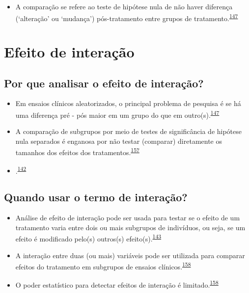 \documentclass[
  a4paper,
]{book}
\providecommand{\tightlist}{%
  \setlength{\itemsep}{0pt}\setlength{\parskip}{0pt}}
\begin{document}
\begin{itemize}
\tightlist
\item
  A comparação se refere ao teste de hipótese nula de não haver diferença (`alteração' ou `mudança') pós-tratamento entre grupos de tratamento.\textsuperscript{\protect\hyperlink{ref-bland2011}{147}}
\end{itemize}

\hypertarget{interacao}{%
\section{Efeito de interação}\label{interacao}}

\hypertarget{por-que-analisar-o-efeito-de-interauxe7uxe3o}{%
\subsection{Por que analisar o efeito de interação?}\label{por-que-analisar-o-efeito-de-interauxe7uxe3o}}

\begin{itemize}
\item
  Em ensaios clínicos aleatorizados, o principal problema de pesquisa é se há uma diferença pré - pós maior em um grupo do que em outro(s).\textsuperscript{\protect\hyperlink{ref-bland2011}{147}}
\item
  A comparação de subgrupos por meio de testes de significância de hipótese nula separados é enganosa por não testar (comparar) diretamente os tamanhos dos efeitos dos tratamentos.\textsuperscript{\protect\hyperlink{ref-Matthews1996}{157}}
\item
  .\textsuperscript{\protect\hyperlink{ref-Bours2023}{142}}
\end{itemize}

\hypertarget{quando-usar-o-termo-de-interauxe7uxe3o}{%
\subsection{Quando usar o termo de interação?}\label{quando-usar-o-termo-de-interauxe7uxe3o}}

\begin{itemize}
\item
  Análise de efeito de interação pode ser usada para testar se o efeito de um tratamento varia entre dois ou mais subgrupos de indivíduos, ou seja, se um efeito é modificado pelo(s) outros(s) efeito(s).\textsuperscript{\protect\hyperlink{ref-Altman1996}{143}}
\item
  A interação entre duas (ou mais) variáveis pode ser utilizada para comparar efeitos do tratamento em subgrupos de ensaios clínicos.\textsuperscript{\protect\hyperlink{ref-Altman2003}{158}}
\item
  O poder estatístico para detectar efeitos de interação é limitado.\textsuperscript{\protect\hyperlink{ref-Altman2003}{158}}
\end{itemize}
\end{document}
